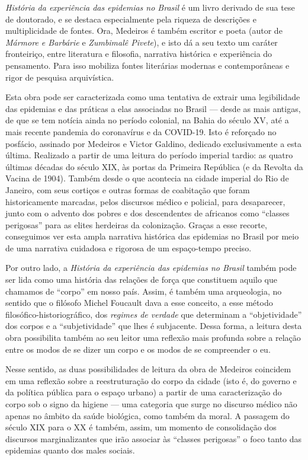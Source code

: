 \textit{História da experiência das epidemias no Brasil} é um livro
derivado de sua tese de doutorado, e se destaca especialmente pela
riqueza de descrições e multiplicidade de fontes. Ora, Medeiros é também
escritor e poeta (autor de \textit{Mármore e Barbárie} e \textit{Zumbimalê
Pivete}), e isto dá a seu texto um caráter fronteiriço, entre literatura
e filosofia, narrativa histórica e experiência do pensamento. Para isso
mobiliza fontes literárias modernas e contemporâneas e rigor de pesquisa
arquivística.

Esta obra pode ser caracterizada como uma tentativa de extrair uma
legibilidade das epidemias e das práticas a elas associadas no Brasil ---
desde as mais antigas, de que se tem notícia ainda no período colonial,
na Bahia do século XV, até a mais recente pandemia do coronavírus e da
COVID-19. Isto é reforçado no posfácio, assinado por Medeiros e Victor
Galdino, dedicado exclusivamente a esta última. Realizado a partir de
uma leitura do período imperial tardio: as quatro últimas décadas do
século XIX, às portas da Primeira República (e da Revolta da Vacina de
1904). Também desde o que acontecia na cidade imperial do Rio de
Janeiro, com seus cortiços e outras formas de coabitação que foram
historicamente marcadas, pelos discursos médico e policial, para
desaparecer, junto com o advento dos pobres e dos descendentes de
africanos como ``classes perigosas'' para as elites herdeiras da
colonização. Graças a esse recorte, conseguimos ver esta ampla narrativa
histórica das epidemias no Brasil por meio de uma narrativa cuidadosa e
rigorosa de um espaço-tempo preciso.

Por outro lado, a \textit{História da experiência das epidemias no Brasil}
também pode ser lida como uma história das relações de força que
constituem aquilo que chamamos de ``corpo'' em nosso país. Assim, é
também uma arqueologia, no sentido que o filósofo Michel Foucault dava a
esse conceito, a esse método filosófico-historiográfico, dos
\textit{regimes de verdade} que determinam a ``objetividade'' dos corpos e
a ``subjetividade'' que lhes é subjacente. Dessa forma, a leitura desta
obra possibilita também ao seu leitor uma reflexão mais profunda sobre a
relação entre os modos de se dizer um corpo e os modos de se compreender
o eu.

Nesse sentido, as duas possibilidades de leitura da obra de Medeiros
coincidem em uma reflexão sobre a reestruturação do corpo da cidade
(isto é, do governo e da política pública para o espaço urbano) a partir
de uma caracterização do corpo sob o signo da higiene --- uma categoria
que surge no discurso médico não apenas no âmbito da saúde biológica,
como também da moral. A passagem do século XIX para o XX é também,
assim, um momento de consolidação dos discursos marginalizantes que irão
associar às ``classes perigosas'' o foco tanto das epidemias quanto dos
males sociais.

